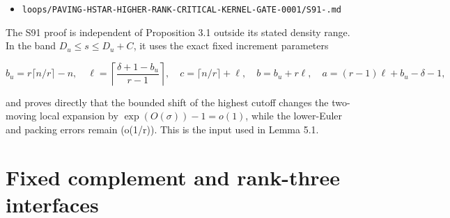 \documentclass[10pt]{article}
\begin{document}
\begin{itemize}
\item \texttt{loops/\allowbreak{}PAVING-\allowbreak{}HSTAR-\allowbreak{}HIGHER-\allowbreak{}RANK-\allowbreak{}CRITICAL-\allowbreak{}KERNEL-\allowbreak{}GATE-\allowbreak{}0001/\allowbreak{}S91-.\allowbreak{}md}
\end{itemize}

The S91 proof is independent of Proposition 3.1 outside its stated density
range.  In the band $D_u\le s\le D_u+C$, it uses the exact fixed increment
parameters

\[
 b_u=r\lceil n/r\rceil-n,
 \quad \ell=\left\lceil\frac{\delta+1-b_u}{r-1}\right\rceil,
 \quad c=\lceil n/r\rceil+\ell,
 \quad b=b_u+r\ell,
 \quad a=(r-1)\ell+b_u-\delta-1,
\]

and proves directly that the bounded shift of the highest cutoff changes the
two-moving local expansion by $\exp(O(\sigma))-1=o(1)$, while the lower-Euler
and packing errors remain (o(1/r)).  This is the input used in Lemma 5.1.

\section{Fixed complement and rank-three interfaces}
\end{document}
